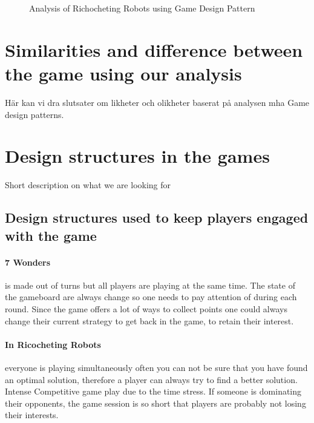 \documentclass[a4paper]{article}
\begin{document}
\begin{figure}[h!]

  \caption{Analysis of Richocheting Robots using Game Design Pattern} 
  \label{fig:RRW}
\end{figure}

\section{Similarities and difference between the game using our analysis}
  Här kan vi dra slutsater om likheter och olikheter baserat på analysen mha Game design patterns. 

\section{Design structures in the games}
Short description on what we are looking for

\subsection{Design structures used to keep players engaged with the game}
\paragraph{7 Wonders} is made out of turns but all players are playing at the same time. The state of the gameboard are always change so one needs to pay attention of during each round. Since the game offers a lot of ways to collect points one could always change their current strategy to get back in the game, to retain their interest.

\paragraph{In Ricocheting Robots} everyone is playing simultaneously often you can not be sure that you have found an optimal solution, therefore a player can always try to find a better solution. Intense Competitive game play due to the time stress. If someone is dominating their opponents, the game session is so short that players are probably not losing their interests.
\end{document}
